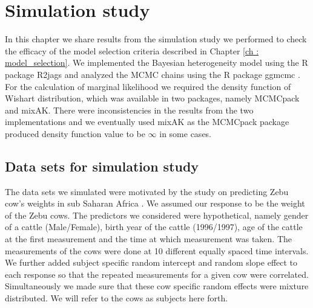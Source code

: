 
\chapter{Simulation study}
\label{ch : simulation_study}

In this chapter we share results from the simulation study we performed to check the efficacy of the model selection criteria described in Chapter \ref{ch : model_selection}. We implemented the Bayesian heterogeneity model using the R package R2jags \citep{su_r2jags:_2015} and analyzed the MCMC chains using the R package ggmcmc \citep{marin_ggmcmc:_2016}. For the calculation of marginal likelihood we required the density function of Wishart distribution, which was available in two packages, namely MCMCpack and mixAK. There were inconsistencies in the results from the two implementations and we eventually used mixAK \citep{komarek_mixak:_2015} as the MCMCpack package produced density function value to be $\infty$ in some cases.

\section{Data sets for simulation study}
The data sets we simulated were motivated by the study on predicting Zebu cow's weights in sub Saharan Africa \citep{lesosky_live_2012}. We assumed our response to be the weight of the Zebu cows. The predictors we considered were hypothetical, namely gender of a cattle (Male/Female), birth year of the cattle (1996/1997), age of the cattle at the first measurement and the time at which measurement was taken. The measurements of the cows were done at 10 different equally spaced time intervals. We further added subject specific random intercept and random slope effect to each response so that the repeated measurements for a given cow were correlated. Simultaneously we made sure that these cow specific random effects were mixture distributed. We will refer to the cows as subjects here forth.

